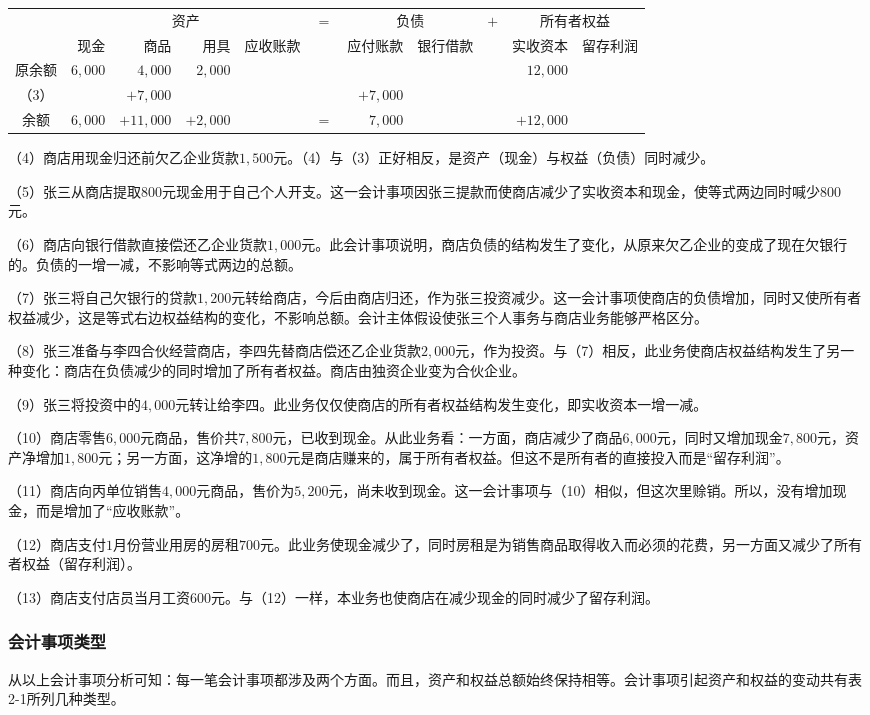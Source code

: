 		\begin{table}[!ht]
			\centering
			\begin{tabular}{c*{10}{r}}
							 & \multicolumn{4}{c}{资产}& \multirow{2}{*}{$=$} & \multicolumn{2}{c}{负债} & \multirow{2}{*}{$+$} & \multicolumn{2}{c}{所有者权益} \\
				\cline{2-5} \cline{7-8} \cline{10-11}
							 & 现金 & 商品 & 用具 & 应收账款 & & 应付账款 & 银行借款 & & 实收资本 & 留存利润 \\ 
				原余额 & $6,000$ & $4,000$  & $2,000$ & \multicolumn{5}{c}{} & $12,000$  \\
				（3）  &         & $+7,000$ & \multicolumn{3}{c}{} & $+7,000$  \\
				\cline{2-5} \cline{7-8} \cline{10-11}
				余额   & $6,000$ & $+11,000$ & $+2,000$ & & $=$ & $7,000$ & \multicolumn{2}{c}{} & $+12,000$   \\
			\end{tabular}
		\end{table}

		（4）商店用现金归还前欠乙企业货款$1,500$元。（4）与（3）正好相反，是资产（现金）与权益（负债）同时减少。

		（5）张三从商店提取$800$元现金用于自己个人开支。这一会计事项因张三提款而使商店减少了实收资本和现金，使等式两边同时喊少$800$元。

		（6）商店向银行借款直接偿还乙企业货款$1,000$元。此会计事项说明，商店负债的结构发生了变化，从原来欠乙企业的变成了现在欠银行的。负债的一增一减，不影响等式两边的总额。

		（7）张三将自己欠银行的贷款$1,200$元转给商店，今后由商店归还，作为张三投资减少。这一会计事项使商店的负债增加，同时又使所有者权益减少，这是等式右边权益结构的变化，不影响总额。会计主体假设使张三个人事务与商店业务能够严格区分。

		（8）张三准备与李四合伙经营商店，李四先替商店偿还乙企业货款$2,000$元，作为投资。与（7）相反，此业务使商店权益结构发生了另一种变化：商店在负债减少的同时增加了所有者权益。商店由独资企业变为合伙企业。

		（9）张三将投资中的$4,000$元转让给李四。此业务仅仅使商店的所有者权益结构发生变化，即实收资本一增一减。

		（10）商店零售$6,000$元商品，售价共$7,800$元，已收到现金。从此业务看：一方面，商店减少了商品$6,000$元，同时又增加现金$7,800$元，资产净增加$1,800$元；另一方面，这净增的$1,800$元是商店赚来的，属于所有者权益。但这不是所有者的直接投入而是“留存利润”。

		（11）商店向丙单位销售$4,000$元商品，售价为$5,200$元，尚未收到现金。这一会计事项与（10）相似，但这次里赊销。所以，没有增加现金，而是增加了“应收账款”。

		（12）商店支付$1$月份营业用房的房租$700$元。此业务使现金减少了，同时房租是为销售商品取得收入而必须的花费，另一方面又减少了所有者权益（留存利润）。

		（13）商店支付店员当月工资$600$元。与（12）一样，本业务也使商店在减少现金的同时减少了留存利润。

		\subsubsection{会计事项类型}

		从以上会计事项分析可知：每一笔会计事项都涉及两个方面。而且，资产和权益总额始终保持相等。会计事项引起资产和权益的变动共有表2-1所列几种类型。








